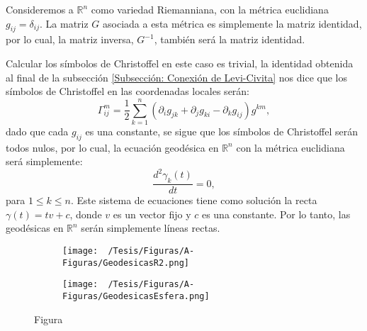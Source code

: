 \begin{example}
	Consideremos a $\mathbb{R}^{n}$ como variedad Riemanniana, con la métrica euclidiana $g_{ij} = \delta_{ij}$. La matriz $G$ asociada a esta métrica es simplemente la matriz identidad, por lo cual, la matriz inversa, $G^{-1}$, también será la matriz identidad.

	Calcular los símbolos de Christoffel en este caso es trivial, la identidad obtenida al final de la subsección \ref{Subsección: Conexión de Levi-Civita} nos dice que los símbolos de Christoffel en las coordenadas locales serán:
	\[
		\Gamma_{ij}^{m} = \frac{1}{2} \sum_{k=1}^{n}  (\partial_{i}g_{jk} + \partial_{j}g_{ki} - \partial_{k}g_{ij}) g^{km},
	\]
	dado que cada $g_{ij}$ es una constante, se sigue que los símbolos de Christoffel serán todos nulos, por lo cual, la ecuación geodésica en $\mathbb{R}^n$ con la métrica euclidiana será simplemente:
	\[
		\frac{d^{2}\gamma_k(t)}{dt} = 0,
	\]
	para $1 \leq k \leq n$. Este sistema de ecuaciones tiene como solución la recta $\gamma(t) = tv + c$, donde $v$ es un vector fijo y $c$ es una constante. Por lo tanto, las geodésicas en $\mathbb{R}^n$ serán simplemente líneas rectas.
\end{example}

\begin{center}
	\begin{figure}[h]
		\centering
		\begin{subfigure}{0.45\textwidth}
			\centering
			\texttt{[image: ~/Tesis/Figuras/A-Figuras/GeodesicasR2.png]}
		\end{subfigure}
		\begin{subfigure}{0.5\textwidth}
			\centering
			\texttt{[image: ~/Tesis/Figuras/A-Figuras/GeodesicasEsfera.png]}
		\end{subfigure}
    \caption{Figura}
	\end{figure}
\end{center}
